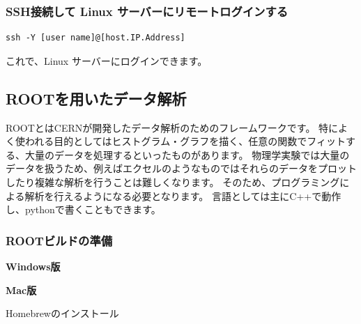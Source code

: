 \documentclass[10pt]{ujarticle}
\begin{document}
\subsubsection{SSH接続して Linux サーバーにリモートログインする}
\begin{lstlisting}
ssh -Y [user name]@[host.IP.Address]
\end{lstlisting}
これで、Linux サーバーにログインできます。

\subsection{ROOTを用いたデータ解析}

ROOTとはCERNが開発したデータ解析のためのフレームワークです。
特によく使われる目的としてはヒストグラム・グラフを描く、任意の関数でフィットする、大量のデータを処理するといったものがあります。
物理学実験では大量のデータを扱うため、例えばエクセルのようなものではそれらのデータをプロットしたり複雑な解析を行うことは難しくなります。
そのため、プログラミングによる解析を行えるようになる必要となります。
言語としては主にC++で動作し、pythonで書くこともできます。

\subsubsection{ROOTビルドの準備}

\vspace{1cm}
{\Large \bf Windows版}
\vspace{0.5cm}

\vspace{1cm}
{\Large \bf Mac版}
\normalsize{}

\vspace{0.5cm}
Homebrewのインストール
\vspace{0.3cm}
\end{document}
